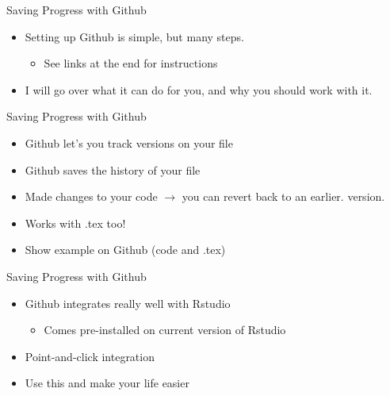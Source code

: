 \documentclass[ignorenonframetext,]{beamer}
\providecommand{\tightlist}{%
  \setlength{\itemsep}{0pt}\setlength{\parskip}{0pt}}
\begin{document}
\begin{frame}{Saving Progress with Github}
\protect\hypertarget{saving-progress-with-github-1}{}

\begin{itemize}
\tightlist
\item
  Setting up Github is simple, but many steps.

  \begin{itemize}
  \tightlist
  \item
    See links at the end for instructions
  \end{itemize}
\item
  I will go over what it can do for you, and why you should work with
  it.
\end{itemize}

\end{frame}

\begin{frame}{Saving Progress with Github}
\protect\hypertarget{saving-progress-with-github-2}{}

\begin{itemize}
\item
  Github let’s you track versions on your file
\item
  Github saves the history of your file
\item
  Made changes to your code \(\rightarrow\) you can
  \alert{revert back to an earlier}. version.
\item
  Works with .tex too!
\item
  Show example on Github (code and .tex)
\end{itemize}

\end{frame}

\begin{frame}{Saving Progress with Github}
\protect\hypertarget{saving-progress-with-github-3}{}

\begin{itemize}
\item
  Github integrates really well with Rstudio

  \begin{itemize}
  \tightlist
  \item
    Comes pre-installed on current version of Rstudio
  \end{itemize}
\item
  Point-and-click integration
\item
  Use this and make your life easier
\end{itemize}

\end{frame}
\end{document}
